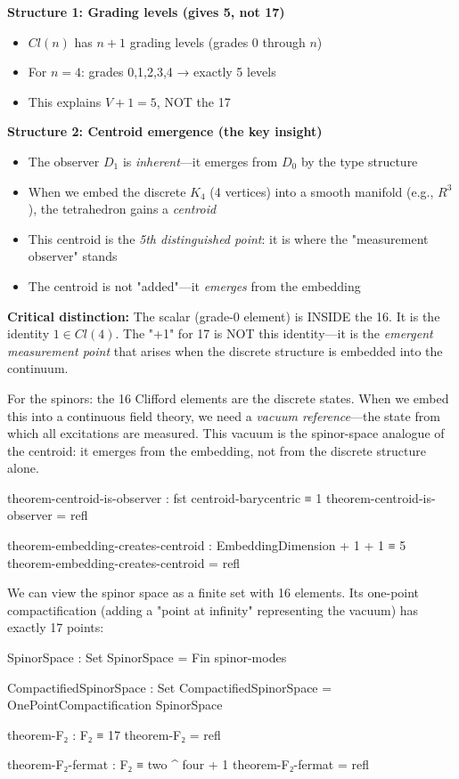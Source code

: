 \documentclass[11pt,a4paper]{book}
\def\mathbb#1{#1}%
\def\text#1{#1}%
\begin{document}
\textbf{Structure 1: Grading levels (gives 5, not 17)}
\begin{itemize}
\item $\text{Cl}(n)$ has $n+1$ grading levels (grades 0 through $n$)
\item For $n=4$: grades 0,1,2,3,4 → exactly 5 levels
\item This explains $V + 1 = 5$, NOT the 17
\end{itemize}

\textbf{Structure 2: Centroid emergence (the key insight)}
\begin{itemize}
\item The observer $D_1$ is \emph{inherent}---it emerges from $D_0$ by the type structure
\item When we embed the discrete $K_4$ (4 vertices) into a smooth manifold (e.g., $\mathbb{R}^3$), 
      the tetrahedron gains a \emph{centroid}
\item This centroid is the \emph{5th distinguished point}: it is where the "measurement observer" stands
\item The centroid is not "added"---it \emph{emerges} from the embedding
\end{itemize}

\textbf{Critical distinction:} The scalar (grade-0 element) is INSIDE the 16. It is the 
identity $1 \in \text{Cl}(4)$. The "+1" for 17 is NOT this identity---it is the 
\emph{emergent measurement point} that arises when the discrete structure is embedded 
into the continuum.

For the spinors: the 16 Clifford elements are the discrete states. When we embed this 
into a continuous field theory, we need a \emph{vacuum reference}---the state from which 
all excitations are measured. This vacuum is the spinor-space analogue of the centroid:
it emerges from the embedding, not from the discrete structure alone.

\begin{code}
theorem-centroid-is-observer : fst centroid-barycentric ≡ 1
theorem-centroid-is-observer = refl

theorem-embedding-creates-centroid : EmbeddingDimension + 1 + 1 ≡ 5
theorem-embedding-creates-centroid = refl
\end{code}

We can view the spinor space as a finite set with 16 elements. Its one-point compactification 
(adding a "point at infinity" representing the vacuum) has exactly 17 points:

\begin{code}
SpinorSpace : Set
SpinorSpace = Fin spinor-modes

CompactifiedSpinorSpace : Set
CompactifiedSpinorSpace = OnePointCompactification SpinorSpace

theorem-F₂ : F₂ ≡ 17
theorem-F₂ = refl

theorem-F₂-fermat : F₂ ≡ two ^ four + 1
theorem-F₂-fermat = refl
\end{code}
\end{document}
